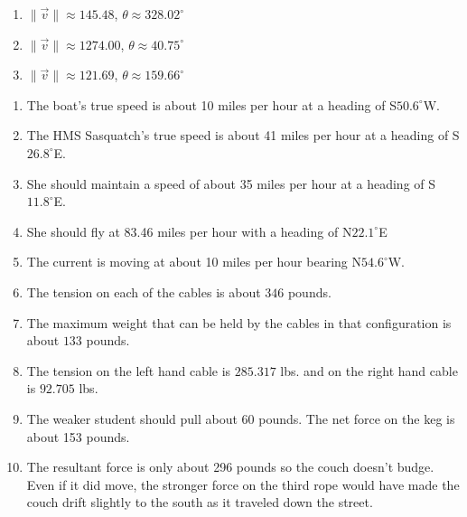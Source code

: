 \documentclass{ximera}
\begin{document}
 

 

\begin{enumerate}

\setcounter{enumi}{\value{HW}}

\item \small $\|\overrightarrow{v}\| \approx 145.48$, $\theta \approx 328.02^{\circ}$ \normalsize
\item \small $\|\overrightarrow{v}\| \approx 1274.00$, $\theta \approx 40.75^{\circ}$ \normalsize
\item \small $\|\overrightarrow{v}\| \approx 121.69$, $\theta \approx 159.66^{\circ}$ \normalsize

\setcounter{HW}{\value{enumi}}

\end{enumerate}

 

\begin{enumerate}

\setcounter{enumi}{\value{HW}}

\item The boat's true speed is about 10 miles per hour at a heading of S$50.6^{\circ}$W.

\item  The HMS Sasquatch's true speed is about 41 miles per hour at a heading of S$26.8^{\circ}$E.

\item  She should maintain a speed of about 35 miles per hour at a heading of S$11.8^{\circ}$E.

\item She should fly at 83.46 miles per hour with a heading of N$22.1^{\circ}$E

\item  The current is moving at about 10 miles per hour bearing N$54.6^{\circ}$W.

\item  The tension on each of the cables is about $346$ pounds.

\item  The maximum weight that can be held by the cables in that configuration is about $133$ pounds.

\item The tension on the left hand cable is $285.317$ lbs. and on the right hand cable is $92.705$ lbs.

\item The weaker student should pull about 60 pounds.  The net force on the keg is about 153 pounds.

\item The resultant force is only about 296 pounds so the couch doesn't budge.  Even if it did move, the stronger force on the third rope would have made the couch drift slightly to the south as it traveled down the street.  

\end{enumerate}
\end{document}
